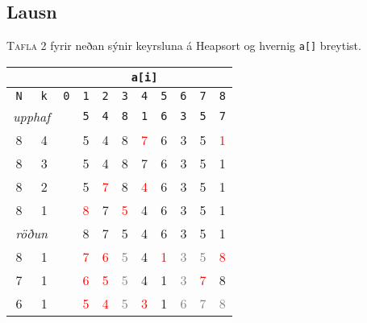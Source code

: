 \documentclass[12pt, a4paper, hidelinks]{article}
\begin{document}
\newcommand*\circled[1]{\tikz[baseline=(char.base)]{
            \node[shape=circle,draw,inner sep=2pt] (char) {\texttt{#1}};}}
\newcommand*\del[1]{\tikz[baseline=(char.base)]{
            \node[shape=circle,draw=white,inner sep=2pt] (char) {\color{red}\texttt{#1}};}}
\newcommand*\circledend[1]{\tikz[baseline=(char.base)]{
            \node[shape=circle,draw=white,inner sep=2pt] (char) {\texttt{#1}};}}

\subsection*{Lausn}
\textsc{Tafla} 2 fyrir neðan sýnir keyrsluna á Heapsort og hvernig \texttt{a[]} breytist.

\newcommand*\exch[1]{\textcolor{red}#1}
\newcommand*\g{\textcolor{gray}}
\begin{table}[H]
  \centering
  \ttfamily
  \begin{tabular}{ccccccccccc}
    \multicolumn{2}{c}{} & \multicolumn{9}{c}{\texttt{a[i]}} \\
    \toprule 
    \texttt{N} & \texttt{k}  & \texttt{0} & \texttt{1} & \texttt{2} & \texttt{3} & \texttt{4} & \texttt{5} & \texttt{6} & \texttt{7} & \texttt{8} \\
    \cmidrule{3-11}
    \multicolumn{2}{c}{\scriptsize \rmfamily \itshape upphaf} &                  & \texttt{5} & \texttt{4} & \texttt{8} & \texttt{1} & \texttt{6} & \texttt{3} & \texttt{5} & \texttt{7} \\
    8          & 4           &            & 5          & 4          & 8          & \exch{7}   & 6          & 3          & 5          & \exch{1} \\
    8          & 3           &            & 5          & 4          & 8          & 7          & 6          & 3          & 5          & 1 \\
    8  & 2  & & 5        & \exch{7}   & 8          & \exch{4}   & 6 & 3 & 5 & 1 \\
    8  & 1  & & \exch{8} & 7          & \exch{5}   & 4          & 6 & 3 & 5 & 1 \\
    \multicolumn{2}{c}{\scriptsize \rmfamily \itshape röðun} & & 8        & 7          & 5          & 4          & 6 & 3 & 5 & 1 \\
    8  & 1  & & \exch{7} & \exch{6} & \g 5 & 4 & \exch{1} & \g 3 & \g 5 & \exch{8} \\
    7  & 1  & & \exch{6} & \exch{5} & \g 5 & 4 & 1 & \g 3 & \exch{7} & \color{gray} 8 \\
    6  & 1  & & \exch{5} & \exch{4} & \g 5 & \exch{3} & 1 & \g 6 & \g 7 & \g 8 \\

\end{tabular}
\end{table}
\end{document}
